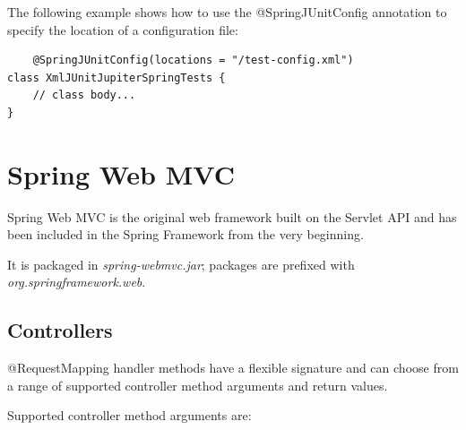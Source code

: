 \documentclass{scrartcl}
\begin{document}
The following example shows how to use the @SpringJUnitConfig annotation to specify the location of a configuration file:

\begin{lstlisting}
    @SpringJUnitConfig(locations = "/test-config.xml")
class XmlJUnitJupiterSpringTests {
    // class body...
}
\end{lstlisting}

\section{Spring Web MVC}

Spring Web MVC is the original web framework built on the Servlet API and has been included in the Spring Framework from the very beginning.

It is packaged in \textit{spring-webmvc.jar}; packages are prefixed with \textit{org.springframework.web}.

\subsection{Controllers}

    @RequestMapping handler methods have a flexible signatu\texttt{}re and can choose from a range of supported controller method arguments and return values.

    Supported controller method arguments are:
\end{document}
